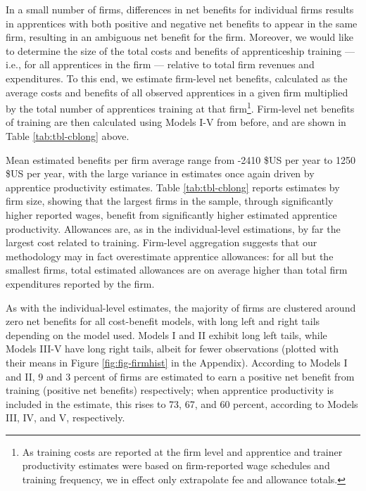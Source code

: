 \documentclass[
  11pt,
a4paper
]{report}
\begin{document}
\noindent In a small number of firms, differences in net benefits for individual firms results in apprentices with both positive and negative net benefits to appear in the same firm, resulting in an ambiguous net benefit for the firm. Moreover, we would like to determine the size of the total costs and benefits of apprenticeship training --- i.e., for all apprentices in the firm --- relative to total firm revenues and expenditures. To this end, we estimate firm-level net benefits, calculated as the average costs and benefits of all observed apprentices in a given firm multiplied by the total number of apprentices training at that firm\footnote{As training costs are reported at the firm level and apprentice and trainer productivity estimates were based on firm-reported wage schedules and training frequency, we in effect only extrapolate fee and allowance totals.}. Firm-level net benefits of training are then calculated using Models I-V from before, and are shown in Table \ref{tab:tbl-cblong} above.

Mean estimated benefits per firm average range from -2410 \$US per year to 1250 \$US per year, with the large variance in estimates once again driven by apprentice productivity estimates. Table \ref{tab:tbl-cblong} reports estimates by firm size, showing that the largest firms in the sample, through significantly higher reported wages, benefit from significantly higher estimated apprentice productivity. Allowances are, as in the individual-level estimations, by far the largest cost related to training. Firm-level aggregation suggests that our methodology may in fact overestimate apprentice allowances: for all but the smallest firms, total estimated allowances are on average higher than total firm expenditures reported by the firm.

As with the individual-level estimates, the majority of firms are clustered around zero net benefits for all cost-benefit models, with long left and right tails depending on the model used. Models I and II exhibit long left tails, while Models III-V have long right tails, albeit for fewer observations (plotted with their means in Figure \ref{fig:fig-firmhist} in the Appendix). According to Models I and II, 9 and 3 percent of firms are estimated to earn a positive net benefit from training (positive net benefits) respectively; when apprentice productivity is included in the estimate, this rises to 73, 67, and 60 percent, according to Models III, IV, and V, respectively.
\end{document}
